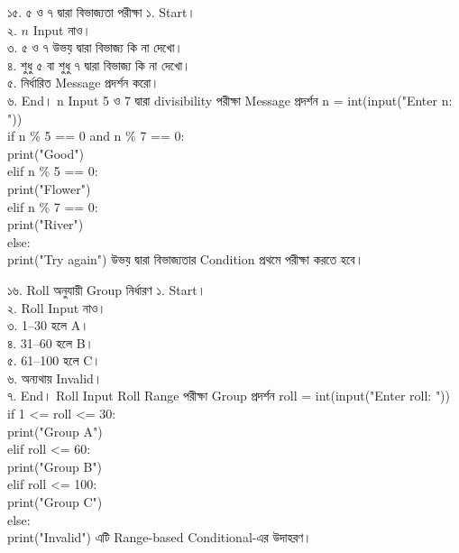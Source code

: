 \exerciseTable
{১৫. ৫ ও ৭ দ্বারা বিভাজ্যতা পরীক্ষা}
{
১. Start।\\
২. \(n\) Input নাও।\\
৩. ৫ ও ৭ উভয় দ্বারা বিভাজ্য কি না দেখো।\\
৪. শুধু ৫ বা শুধু ৭ দ্বারা বিভাজ্য কি না দেখো।\\
৫. নির্ধারিত Message প্রদর্শন করো।\\
৬. End।
}
{
\linearflow
{n Input}
{5 ও 7 দ্বারা divisibility পরীক্ষা}
{Message প্রদর্শন}
}
{
n = int(input("Enter n: "))\\[0.5mm]
if n \% 5 == 0 and n \% 7 == 0:\\
\hspace*{4mm}print("Good")\\
elif n \% 5 == 0:\\
\hspace*{4mm}print("Flower")\\
elif n \% 7 == 0:\\
\hspace*{4mm}print("River")\\
else:\\
\hspace*{4mm}print("Try again")
}
{
উভয় দ্বারা বিভাজ্যতার Condition প্রথমে পরীক্ষা করতে হবে।
}


\exerciseTable
{১৬. Roll অনুযায়ী Group নির্ধারণ}
{
১. Start।\\
২. Roll Input নাও।\\
৩. 1--30 হলে A।\\
৪. 31--60 হলে B।\\
৫. 61--100 হলে C।\\
৬. অন্যথায় Invalid।\\
৭. End।
}
{
\linearflow
{Roll Input}
{Roll Range পরীক্ষা}
{Group প্রদর্শন}
}
{
roll = int(input("Enter roll: "))\\[0.5mm]
if 1 <= roll <= 30:\\
\hspace*{4mm}print("Group A")\\
elif roll <= 60:\\
\hspace*{4mm}print("Group B")\\
elif roll <= 100:\\
\hspace*{4mm}print("Group C")\\
else:\\
\hspace*{4mm}print("Invalid")
}
{
এটি Range-based Conditional-এর উদাহরণ।
}

